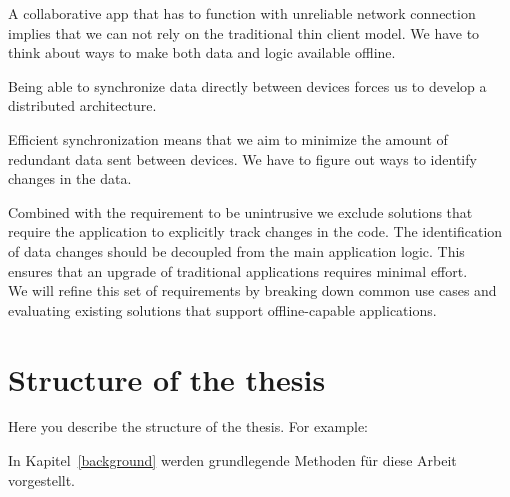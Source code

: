 A collaborative app that has to function with unreliable network connection implies that we can not rely on the traditional thin client model. We have to think about ways to make both data and logic available offline.

Being able to synchronize data directly between devices forces us to develop a distributed architecture.

Efficient synchronization means that we aim to minimize the amount of redundant data sent between devices. We have to figure out ways to identify changes in the data.

Combined with the requirement to be unintrusive we exclude solutions that require the application to explicitly track changes in the code. The identification of data changes should be decoupled from the main application logic. This ensures that an upgrade of traditional applications requires minimal effort.\\

We will refine this set of requirements by breaking down common use cases and evaluating existing solutions that support offline-capable applications.

\section{Structure of the thesis}
Here you describe the structure of the thesis. For example:

In Kapitel~\ref{background} werden grundlegende Methoden für diese Arbeit vorgestellt.